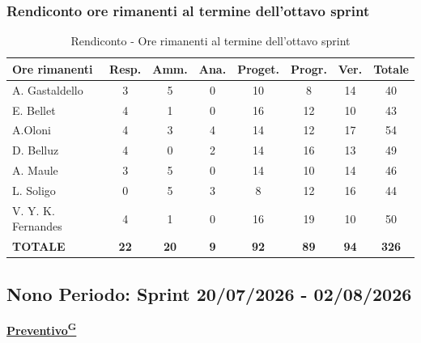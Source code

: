 \documentclass[a4paper,12pt]{article}
\providecommand{\glslink}[2]{\href{https://alittlebyte-19.github.io/Documentazione/glossario.html\#gls-#1}{\underline{#2}\textsuperscript{\scriptsize G}}}
\begin{document}
\subsubsection{Rendiconto ore rimanenti al termine dell'ottavo sprint}
\begin{table}[htbp]
\centering
\renewcommand{\arraystretch}{1.5}
\begin{tabularx}{\textwidth}{|X|c|c|c|c|c|c|c|}
\hline
\textbf{Ore rimanenti} & \textbf{Resp.} & \textbf{Amm.} & \textbf{Ana.} & \textbf{Proget.} & \textbf{Progr.} & \textbf{Ver.} & \textbf{Totale} \\
\hline
A. Gastaldello & 3 & 5 & 0 & 10 & 8 & 14 & 40 \\
\hline
E. Bellet & 4 & 1 & 0 & 16 & 12 & 10 & 43 \\
\hline
A.Oloni & 4 & 3 & 4 & 14 & 12 & 17 & 54 \\
\hline
D. Belluz & 4 & 0 & 2 & 14 & 16 & 13 & 49 \\
\hline
A. Maule & 3 & 5 & 0 & 14 & 10 & 14 & 46 \\
\hline
L. Soligo & 0 & 5 & 3 & 8 & 12 & 16 & 44 \\
\hline
V. Y. K. Fernandes & 4 & 1 & 0 & 16 & 19 & 10 & 50 \\
\hline
\rowcolor{gray!20}
\textbf{TOTALE} & \textbf{22} & \textbf{20} & \textbf{9} & \textbf{92} & \textbf{89} & \textbf{94} & \textbf{326} \\
\hline
\end{tabularx}
\caption{Rendiconto - Ore rimanenti al termine dell'ottavo sprint}
\end{table}

\newpage
\subsection {Nono Periodo: Sprint 20/07/2026 - 02/08/2026}

\label{sec:pec_nonoperiodo}

\vspace{0.5em}

\begin{center}
\noindent\textbf{\glslink{preventivo}{Preventivo}}
\end{center}
\end{document}
